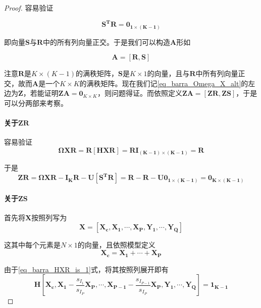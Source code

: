 \begin{proof}
    容易验证

    \begin{equation}
        \bm{S^TR} = \bm{0_{1\times(K-1)}}
    \end{equation}

    即向量$\bm{S}$与$\bm{R}$中的所有列向量正交。于是我们可以构造$\bm{A}$形如

    \begin{equation}
        \bm{A} = [\bm{R}, \bm{S}]
    \end{equation}

    注意$\bm{R}$是$K\times (K-1)$的满秩矩阵，$\bm{S}$是$K\times 1$的向量，且与$\bm{R}$中所有列向量正交，故而$\bm{A}$是一个$K\times K$的满秩矩阵。现在我们记\ref{eq_barra_Omega_X_alt}的左边为$\bm{Z}$，若能证明$\bm{ZA} = \bm{0}_{K\times K}$，则问题得证。而依照定义$\bm{ZA} = [\bm{ZR},\bm{ZS}]$，于是可以分两部来考察。

    \paragraph*{关于$\bm{ZR}$}
    容易验证
    \begin{equation}
        \bm{\Omega X R} = \bm{R [H X R]} = \bm{R I_{(K-1)\times(K-1)}} = \bm{R}
    \end{equation}

    于是
    \begin{equation}
        \bm{ZR} = \bm{\Omega X R} - \bm{I_{K}R} - \bm{U[S^TR]} = \bm{R-R-U0_{1\times (K-1)}} = \bm{0_{K\times(K-1)}}
    \end{equation}

    \paragraph*{关于$\bm{ZS}$}

    首先将$\bm{X}$按照列写为
    \begin{equation*}
        \bm{X} = [\bm{X_c}, \bm{X_1}, \cdots , \bm{X_P}, \bm{Y_1}, \cdots , \bm{Y_Q}]
    \end{equation*}

    这其中每个元素是$N\times 1$的向量，且依照模型定义
    \begin{equation}\label{eq_barra_sum_xi_is_xc}
        \bm{X_c}  = \bm{X_1} + \cdots + \bm{X_P}
    \end{equation}

    由于\ref{eq_barra_HXR_is_1}式，将其按照列展开即有
    \begin{equation}
        \bm{H}[\bm{X_c}, \bm{X_1}-\frac{s_{I_1}}{s_{I_P}}\bm{X_P}, \cdots, \bm{X_{P-1}}-\frac{s_{I_{P-1}}}{s_{I_P}}\bm{X_P}, \bm{Y_1}, \cdots, \bm{Y_Q}] = \bm{1_{K-1}}
    \end{equation}


\end{proof}
